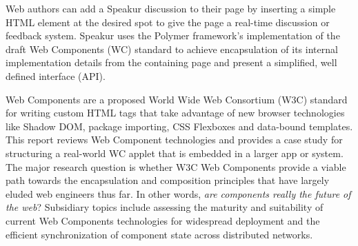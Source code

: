 \documentclass[12pt]{report}	%
\theoremstyle{definition}
\theoremstyle{remark}
\begin{document}
Web authors can add a Speakur discussion to their page by inserting a simple HTML element at the desired spot to give the page a real-time discussion or feedback system.
Speakur uses the Polymer framework's implementation of the draft Web Components (WC) standard to achieve encapsulation of its internal implementation details from the containing page and present a simplified, well defined interface (API).

Web Components are a proposed World Wide Web Consortium (W3C) standard for writing custom HTML tags that take advantage of new browser technologies like Shadow DOM, package importing, CSS Flexboxes and data-bound templates.
This report reviews Web Component technologies and provides a case study for structuring a real-world WC applet that is embedded in a larger app or system.
The major research question is whether W3C Web Components provide a viable path towards the encapsulation and composition principles that have largely eluded web engineers thus far. 
In other words, \textit{are components really the future of the web}? 
Subsidiary topics include assessing the maturity and suitability of current Web Components technologies for widespread deployment and the efficient synchronization of component state across distributed networks.


\tableofcontents   %

\listoftables      %
\listoffigures     %
\lstlistoflistings


%
%







\end{document}

